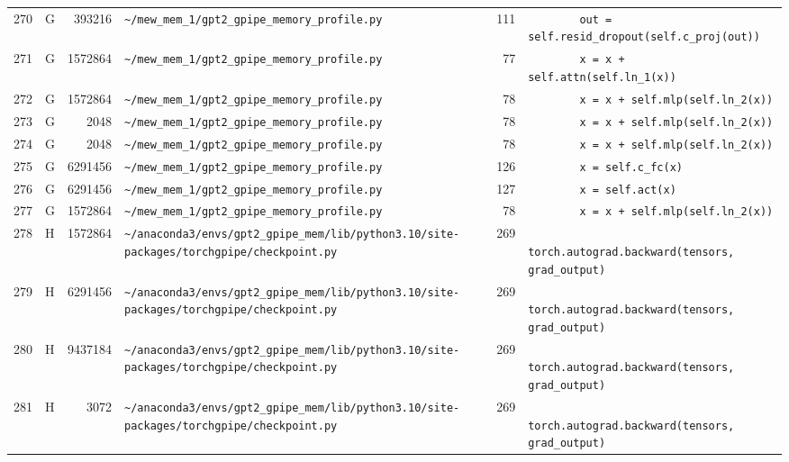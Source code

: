 \documentclass{article}
\begin{document}
\begin{longtable}{r l r p{6.5cm} r p{7.0cm}}
270 & G & 393216 & \lstinline|~/mew_mem_1/gpt2_gpipe_memory_profile.py| & 111 & \lstinline|        out = self.resid_dropout(self.c_proj(out))| \\
271 & G & 1572864 & \lstinline|~/mew_mem_1/gpt2_gpipe_memory_profile.py| & 77 & \lstinline|        x = x + self.attn(self.ln_1(x))| \\
272 & G & 1572864 & \lstinline|~/mew_mem_1/gpt2_gpipe_memory_profile.py| & 78 & \lstinline|        x = x + self.mlp(self.ln_2(x))| \\
273 & G & 2048 & \lstinline|~/mew_mem_1/gpt2_gpipe_memory_profile.py| & 78 & \lstinline|        x = x + self.mlp(self.ln_2(x))| \\
274 & G & 2048 & \lstinline|~/mew_mem_1/gpt2_gpipe_memory_profile.py| & 78 & \lstinline|        x = x + self.mlp(self.ln_2(x))| \\
275 & G & 6291456 & \lstinline|~/mew_mem_1/gpt2_gpipe_memory_profile.py| & 126 & \lstinline|        x = self.c_fc(x)| \\
276 & G & 6291456 & \lstinline|~/mew_mem_1/gpt2_gpipe_memory_profile.py| & 127 & \lstinline|        x = self.act(x)| \\
277 & G & 1572864 & \lstinline|~/mew_mem_1/gpt2_gpipe_memory_profile.py| & 78 & \lstinline|        x = x + self.mlp(self.ln_2(x))| \\
278 & H & 1572864 & \lstinline|~/anaconda3/envs/gpt2_gpipe_mem/lib/python3.10/site-packages/torchgpipe/checkpoint.py| & 269 & \lstinline|            torch.autograd.backward(tensors, grad_output)| \\
279 & H & 6291456 & \lstinline|~/anaconda3/envs/gpt2_gpipe_mem/lib/python3.10/site-packages/torchgpipe/checkpoint.py| & 269 & \lstinline|            torch.autograd.backward(tensors, grad_output)| \\
280 & H & 9437184 & \lstinline|~/anaconda3/envs/gpt2_gpipe_mem/lib/python3.10/site-packages/torchgpipe/checkpoint.py| & 269 & \lstinline|            torch.autograd.backward(tensors, grad_output)| \\
281 & H & 3072 & \lstinline|~/anaconda3/envs/gpt2_gpipe_mem/lib/python3.10/site-packages/torchgpipe/checkpoint.py| & 269 & \lstinline|            torch.autograd.backward(tensors, grad_output)| \\
\end{longtable}
\end{document}
